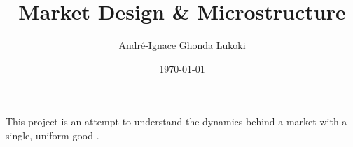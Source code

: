 \documentclass{article}
\title{Market Design \& Microstructure}
\author{André-Ignace Ghonda Lukoki}
\date{\today}
\begin{document}
\maketitle

This project is an attempt to understand the dynamics behind a market with a single, uniform good \cite{Ohara95}.

\pagebreak
 

\end{document}
